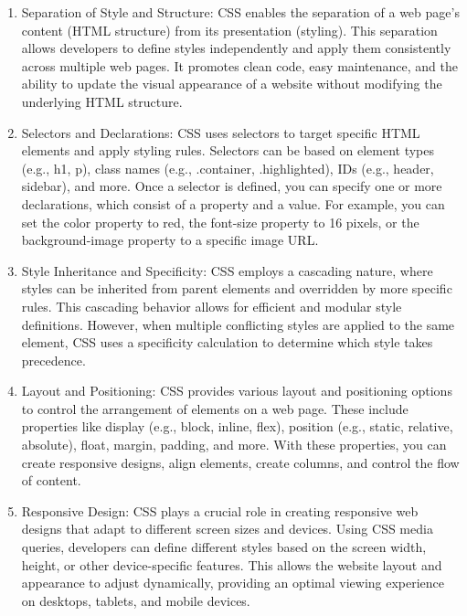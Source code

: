 \documentclass[12 pt, oneside]{book}
\begin{document}
\begin{enumerate}
  \item Separation of Style and Structure: CSS enables the separation of a web page's content (HTML structure) from its presentation (styling). This separation allows developers to define styles independently and apply them consistently across multiple web pages. It promotes clean code, easy maintenance, and the ability to update the visual appearance of a website without modifying the underlying HTML structure.

  \item Selectors and Declarations: CSS uses selectors to target specific HTML elements and apply styling rules. Selectors can be based on element types (e.g., h1, p), class names (e.g., .container, .highlighted), IDs (e.g., header, sidebar), and more. Once a selector is defined, you can specify one or more declarations, which consist of a property and a value. For example, you can set the color property to red, the font-size property to 16 pixels, or the background-image property to a specific image URL.

  \item Style Inheritance and Specificity: CSS employs a cascading nature, where styles can be inherited from parent elements and overridden by more specific rules. This cascading behavior allows for efficient and modular style definitions. However, when multiple conflicting styles are applied to the same element, CSS uses a specificity calculation to determine which style takes precedence.

  \item Layout and Positioning: CSS provides various layout and positioning options to control the arrangement of elements on a web page. These include properties like display (e.g., block, inline, flex), position (e.g., static, relative, absolute), float, margin, padding, and more. With these properties, you can create responsive designs, align elements, create columns, and control the flow of content.

  \item Responsive Design: CSS plays a crucial role in creating responsive web designs that adapt to different screen sizes and devices. Using CSS media queries, developers can define different styles based on the screen width, height, or other device-specific features. This allows the website layout and appearance to adjust dynamically, providing an optimal viewing experience on desktops, tablets, and mobile devices.


\end{enumerate}
\end{document}
